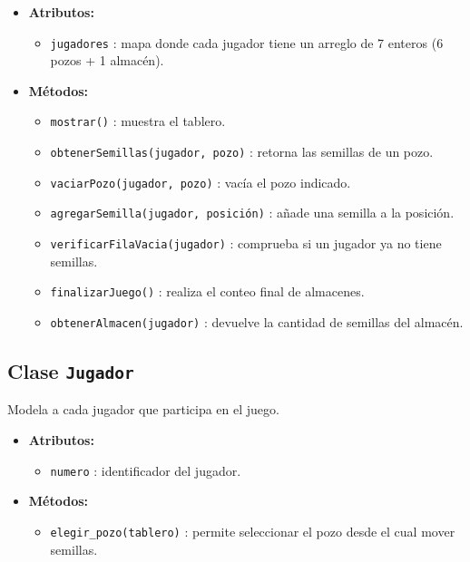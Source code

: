 \documentclass{article}
\begin{document}
\begin{itemize}
  \item \textbf{Atributos:}
  \begin{itemize}
    \item \texttt{jugadores} : mapa donde cada jugador tiene un arreglo de 7 enteros (6 pozos + 1 almacén).
  \end{itemize}
  
  \item \textbf{Métodos:}
  \begin{itemize}
    \item \texttt{mostrar()} : muestra el tablero.
    \item \texttt{obtenerSemillas(jugador, pozo)} : retorna las semillas de un pozo.
    \item \texttt{vaciarPozo(jugador, pozo)} : vacía el pozo indicado.
    \item \texttt{agregarSemilla(jugador, posición)} : añade una semilla a la posición.
    \item \texttt{verificarFilaVacia(jugador)} : comprueba si un jugador ya no tiene semillas.
    \item \texttt{finalizarJuego()} : realiza el conteo final de almacenes.
    \item \texttt{obtenerAlmacen(jugador)} : devuelve la cantidad de semillas del almacén.
  \end{itemize}
\end{itemize}

\subsection*{Clase \texttt{Jugador}}

Modela a cada jugador que participa en el juego.

\begin{itemize}
  \item \textbf{Atributos:}
  \begin{itemize}
    \item \texttt{numero} : identificador del jugador.
  \end{itemize}
  
  \item \textbf{Métodos:}
  \begin{itemize}
    \item \texttt{elegir\_pozo(tablero)} : permite seleccionar el pozo desde el cual mover semillas.
  \end{itemize}
\end{itemize}
\end{document}
